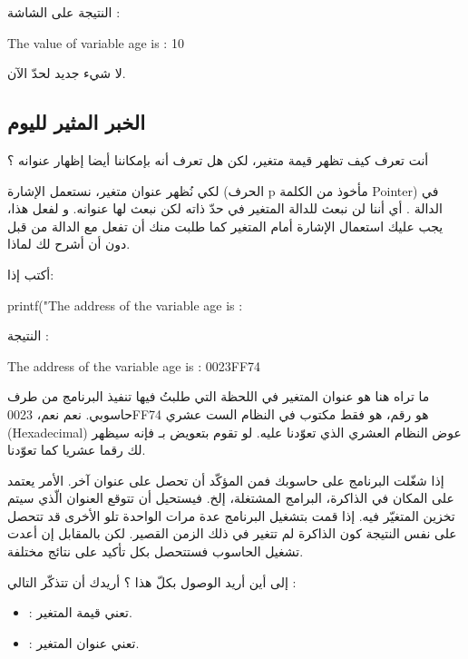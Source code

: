 النتيجة على الشاشة :

\begin{Console}
The value of variable age is : 10
\end{Console}

لا شيء جديد لحدّ الآن.

\subsection{الخبر المثير لليوم}

أنت تعرف كيف تظهر قيمة متغير، لكن هل تعرف أنه بإمكاننا أيضا إظهار عنوانه ؟

لكي نُظهر عنوان متغير، نستعمل الإشارة
(الحرف
\textenglish{p}
مأخوذ من الكلمة
\textenglish{Pointer})
في الدالة
.
أي أننا لن نبعث للدالة
المتغير في حدّ ذاته لكن نبعث لها عنوانه. و لفعل هذا، يجب عليك استعمال الإشارة
\InlineCode{\&}
أمام المتغير
كما طلبت منك أن تفعل مع الدالة
من قبل دون أن أشرح لك لماذا.

أكتب إذا:

\begin{Csource}
printf("The address of the variable age is  : %
\end{Csource}
النتيجة :

\begin{Console}
The address of the variable age is : 0023FF74
\end{Console}

ما تراه هنا هو عنوان المتغير
في اللحظة التي طلبتُ فيها تنفيذ البرنامج من طرف حاسوبي. نعم نعم،
0023FF74
هو رقم، هو فقط مكتوب في النظام الست عشري
(\textenglish{Hexadecimal})
عوض النظام العشري الذي تعوّدنا عليه. لو تقوم بتعويض
بـ
فإنه سيظهر لك رقما عشريا كما تعوّدنا.

\begin{information}
	إذا شغّلت البرنامج على حاسوبك فمن المؤكّد أن تحصل على عنوان آخر. الأمر يعتمد على المكان في الذاكرة، البرامج المشتغلة، إلخ.
فيستحيل أن تتوقع العنوان الّذي سيتم تخزين المتغيّر فيه.
إذا قمت بتشغيل البرنامج عدة مرات الواحدة تلو الأخرى قد تتحصل على نفس النتيجة كون الذاكرة لم تتغير في ذلك الزمن القصير.
لكن بالمقابل إن أعدت تشغيل الحاسوب فستتحصل بكل تأكيد على نتائج مختلفة.
\end{information}

إلى أين أريد الوصول بكلّ هذا ؟ أريدك أن تتذكّر التالي :

\begin{itemize}
	\item {} : تعني قيمة المتغير.
	\item {} : تعني عنوان المتغير.
\end{itemize}

